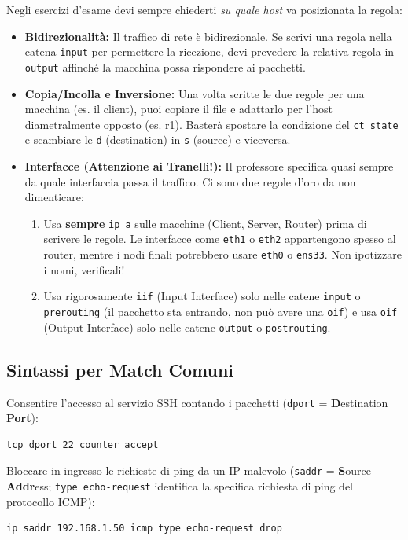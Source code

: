 \documentclass[12pt,a4paper]{report}
\begin{document}
	\begin{nota}
		Negli esercizi d'esame devi sempre chiederti \textit{su quale host} va posizionata la regola:
		\begin{itemize}
			\item \textbf{Bidirezionalità:} Il traffico di rete è bidirezionale. Se scrivi una regola nella catena \texttt{input} per permettere la ricezione, devi prevedere la relativa regola in \texttt{output} affinché la macchina possa rispondere ai pacchetti.
			\item \textbf{Copia/Incolla e Inversione:} Una volta scritte le due regole per una macchina (es. il client), puoi copiare il file e adattarlo per l'host diametralmente opposto (es. r1). Basterà spostare la condizione del \texttt{ct state} e scambiare le \texttt{d} (destination) in \texttt{s} (source) e viceversa.
\item \textbf{Interfacce (Attenzione ai Tranelli!):} Il professore specifica quasi sempre da quale interfaccia passa il traffico. Ci sono due regole d'oro da non dimenticare:
\begin{enumerate}
	\item Usa \textbf{sempre} \texttt{ip a} sulle macchine (Client, Server, Router) prima di scrivere le regole. Le interfacce come \texttt{eth1} o \texttt{eth2} appartengono spesso al router, mentre i nodi finali potrebbero usare \texttt{eth0} o \texttt{ens33}. Non ipotizzare i nomi, verificali!
	\item Usa rigorosamente \texttt{iif} (Input Interface) solo nelle catene \texttt{input} o \texttt{prerouting} (il pacchetto sta entrando, non può avere una \texttt{oif}) e usa \texttt{oif} (Output Interface) solo nelle catene \texttt{output} o \texttt{postrouting}.
\end{enumerate}
\end{itemize}
\end{nota}
	
	\subsection{Sintassi per Match Comuni}
	Consentire l'accesso al servizio SSH contando i pacchetti (\texttt{dport} = \textbf{D}estination \textbf{Port}):
	\begin{lstlisting}[language=bash]
		tcp dport 22 counter accept
	\end{lstlisting}
	Bloccare in ingresso le richieste di ping da un IP malevolo (\texttt{saddr} = \textbf{S}ource \textbf{Addr}ess; \texttt{type echo-request} identifica la specifica richiesta di ping del protocollo ICMP):
	\begin{lstlisting}[language=bash]
		ip saddr 192.168.1.50 icmp type echo-request drop
	\end{lstlisting}
\end{document}
